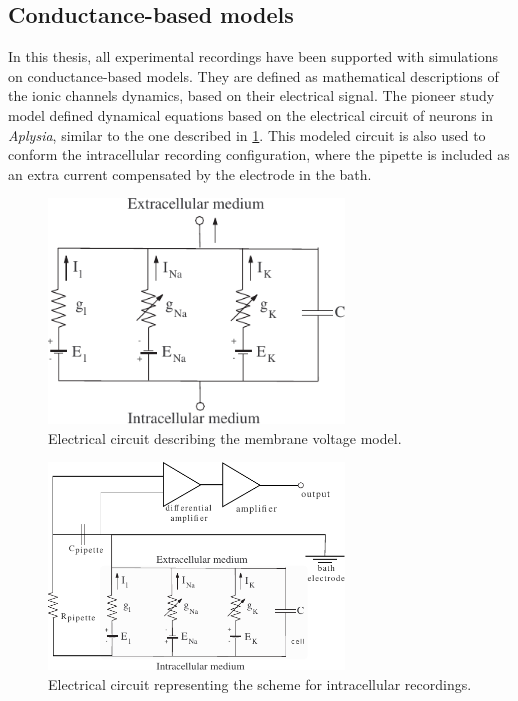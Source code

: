 \subsection{Conductance-based models}

In this thesis, all experimental recordings have been supported with simulations on conductance-based models. They are defined as mathematical descriptions of the ionic channels dynamics, based on their electrical signal. The pioneer study \cite{hodgkin_quantitative_1952} model defined dynamical equations based on the electrical circuit of neurons in \textit{Aplysia}, similar to the one described in \ref{fig:electrical circuit}. This modeled circuit is also used to conform the intracellular recording configuration, where the pipette is included as an extra current compensated by the electrode in the bath.

\begin{figure}[htb!]
	\centering
	\includegraphics[width=0.7\textwidth]{./img/intro/electrical_circuit.pdf}
	\caption{Electrical circuit describing the membrane voltage model.}
	\label{fig:electrical circuit}
\end{figure}

\begin{figure}[htb!]
	\centering
	\includegraphics[width=0.7\textwidth]{./img/intro/intracellular_recording_circuit.pdf}
	\caption{Electrical circuit representing the scheme for intracellular recordings.}
	\label{fig:clamp circuit}
\end{figure}


